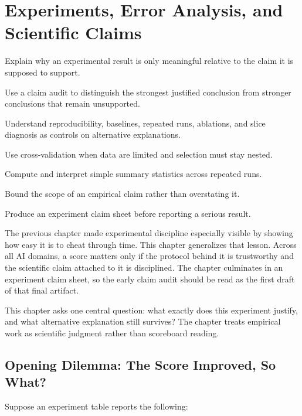 \chapter{Experiments, Error Analysis, and Scientific Claims}

\begin{learninggoals}
\item Explain why an experimental result is only meaningful relative to the claim it is supposed to support.
\item Use a claim audit to distinguish the strongest justified conclusion from stronger conclusions that remain unsupported.
\item Understand reproducibility, baselines, repeated runs, ablations, and slice diagnosis as controls on alternative explanations.
\item Use cross-validation when data are limited and selection must stay nested.
\item Compute and interpret simple summary statistics across repeated runs.
\item Bound the scope of an empirical claim rather than overstating it.
\item Produce an experiment claim sheet before reporting a serious result.
\end{learninggoals}

The previous chapter made experimental discipline especially visible by showing how easy it is to cheat through time. This chapter generalizes that lesson. Across all AI domains, a score matters only if the protocol behind it is trustworthy and the scientific claim attached to it is disciplined. The chapter culminates in an experiment claim sheet, so the early claim audit should be read as the first draft of that final artifact.

\begin{problemsolvinglens}
This chapter asks one central question: what exactly does this experiment justify, and what alternative explanation still survives? The chapter treats empirical work as scientific judgment rather than scoreboard reading.
\end{problemsolvinglens}

\section{Opening Dilemma: The Score Improved, So What?}

Suppose an experiment table reports the following:

